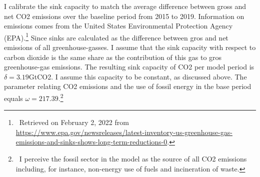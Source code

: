  
 I calibrate the sink capacity to match the average difference between gross and net CO2 emissions over the baseline period from 2015 to 2019.  Information on emissions comes from the United States Environmental Protection Agency (EPA).\footnote{\ Retrieved on February 2, 2022 from  \url{https://www.epa.gov/newsreleases/latest-inventory-us-greenhouse-gas-emissions-and-sinks-shows-long-term-reductions-0}. } Since sinks are calculated as the difference between gros and net emissions of all greenhouse-gasses. I assume that the sink capacity with respect to carbon dioxide is the same share as the contribution of this gas to gros greenhouse-gas emissions. The resulting sink capacity of CO2 per model period is $\delta=3.19$GtCO2.  I assume this capacity to be constant, as discussed above. 
 The parameter relating CO2 emissions and the use of fossil energy in the base period equals $\omega=217.39$.\footnote{\ I perceive the fossil sector in the model as the source of all CO2 emissions including, for instance, non-energy use of fuels and incineration of waste.}  
 
 

 





